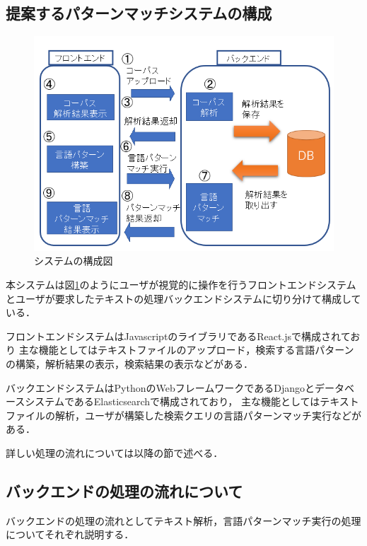 \documentclass{FITpaper}
\begin{document}
\subsection{提案するパターンマッチシステムの構成}

\begin{figure}[htbp]
  \centering
  \includegraphics[scale=0.4]{fig/system_fig.png}
  \caption{システムの構成図}
  \label{fig:sys}
\end{figure}

本システムは図\ref{fig:sys}のようにユーザが視覚的に操作を行うフロントエンドシステムとユーザが要求したテキストの処理バックエンドシステムに切り分けて構成している．

フロントエンドシステムはJavascriptのライブラリであるReact.jsで構成されており
主な機能としてはテキストファイルのアップロード，検索する言語パターンの構築，解析結果の表示，検索結果の表示などがある．

バックエンドシステムはPythonのWebフレームワークであるDjangoとデータベースシステムであるElasticsearchで構成されており，
主な機能としてはテキストファイルの解析，ユーザが構築した検索クエリの言語パターンマッチ実行などがある．



詳しい処理の流れについては以降の節で述べる．

\subsection{バックエンドの処理の流れについて}
バックエンドの処理の流れとしてテキスト解析，言語パターンマッチ実行の処理についてそれぞれ説明する．
\end{document}
